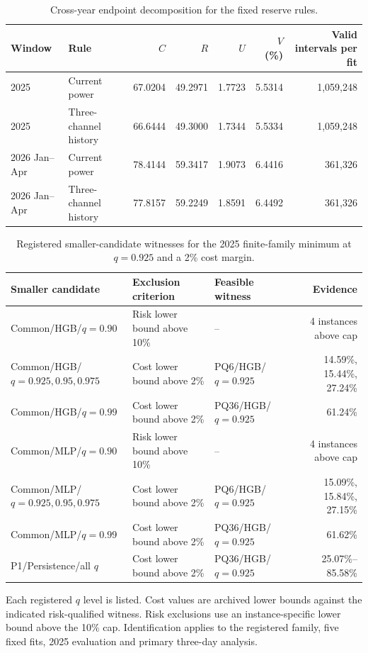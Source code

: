 \begin{table}[H]
\caption{Cross-year endpoint decomposition for the fixed reserve rules.}
\label{tab:crossyear-means}
\centering
\scriptsize
\begin{tabular}{llrrrrr}
\toprule
Window & Rule & $C$ & $R$ & $U$ & $V$ (\%) & Valid intervals per fit \\
\midrule
2025 & Current power & 67.0204 & 49.2971 & 1.7723 & 5.5314 & 1,059,248 \\
2025 & Three-channel history & 66.6444 & 49.3000 & 1.7344 & 5.5334 & 1,059,248 \\
2026 Jan--Apr & Current power & 78.4144 & 59.3417 & 1.9073 & 6.4416 & 361,326 \\
2026 Jan--Apr & Three-channel history & 77.8157 & 59.2249 & 1.8591 & 6.4492 & 361,326 \\
\bottomrule
\end{tabular}
\end{table}

\begin{table}[H]
\caption{Registered smaller-candidate witnesses for the 2025 finite-family minimum at $q=0.925$ and a 2\% cost margin.}
\label{tab:minimum-witnesses}
\centering
\scriptsize
\begin{tabular}{llp{3.2cm}r}
\toprule
Smaller candidate & Exclusion criterion & Feasible witness & Evidence \\
\midrule
Common/HGB/$q=0.90$ & Risk lower bound above 10\% & -- & 4 instances above cap \\
Common/HGB/$q=0.925,0.95,0.975$ & Cost lower bound above 2\% & PQ6/HGB/$q=0.925$ & 14.59\%, 15.44\%, 27.24\% \\
Common/HGB/$q=0.99$ & Cost lower bound above 2\% & PQ36/HGB/$q=0.925$ & 61.24\% \\
Common/MLP/$q=0.90$ & Risk lower bound above 10\% & -- & 4 instances above cap \\
Common/MLP/$q=0.925,0.95,0.975$ & Cost lower bound above 2\% & PQ6/HGB/$q=0.925$ & 15.09\%, 15.84\%, 27.15\% \\
Common/MLP/$q=0.99$ & Cost lower bound above 2\% & PQ36/HGB/$q=0.925$ & 61.62\% \\
P1/Persistence/all $q$ & Cost lower bound above 2\% & PQ36/HGB/$q=0.925$ & 25.07\%--85.58\% \\
\bottomrule
\end{tabular}

\smallskip
\parbox{\textwidth}{\footnotesize Each registered $q$ level is listed. Cost values are archived lower bounds against the indicated risk-qualified witness. Risk exclusions use an instance-specific lower bound above the 10\% cap. Identification applies to the registered family, five fixed fits, 2025 evaluation and primary three-day analysis.}
\end{table}
